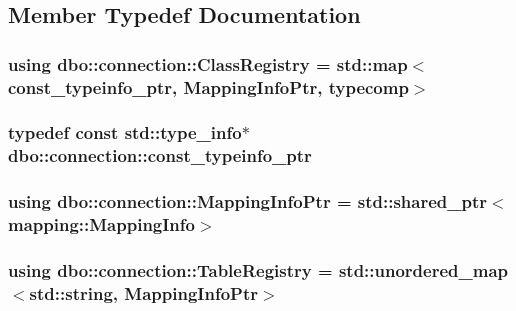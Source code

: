 \subsection{Member Typedef Documentation}
\hypertarget{classdbo_1_1connection_adecb3694055470fb13f96185f3804e4e}{
\subsubsection[{Class\+Registry}]{\setlength{\rightskip}{0pt plus 5cm}using {\bf dbo\+::connection\+::\+Class\+Registry} =  std\+::map$<${\bf const\+\_\+typeinfo\+\_\+ptr}, {\bf Mapping\+Info\+Ptr}, {\bf typecomp}$>$\hspace{0.3cm}{\ttfamily [protected]}}}\label{classdbo_1_1connection_adecb3694055470fb13f96185f3804e4e}
\hypertarget{classdbo_1_1connection_ad9b28dcf5699796d552af8a159f03a5a}{
\subsubsection[{const\+\_\+typeinfo\+\_\+ptr}]{\setlength{\rightskip}{0pt plus 5cm}typedef const std\+::type\+\_\+info$\ast$ {\bf dbo\+::connection\+::const\+\_\+typeinfo\+\_\+ptr}\hspace{0.3cm}{\ttfamily [protected]}}}\label{classdbo_1_1connection_ad9b28dcf5699796d552af8a159f03a5a}
\hypertarget{classdbo_1_1connection_acca03a784c87ffb1ec7bdf33f526dff5}{
\subsubsection[{Mapping\+Info\+Ptr}]{\setlength{\rightskip}{0pt plus 5cm}using {\bf dbo\+::connection\+::\+Mapping\+Info\+Ptr} =  std\+::shared\+\_\+ptr$<${\bf mapping\+::\+Mapping\+Info}$>$\hspace{0.3cm}{\ttfamily [protected]}}}\label{classdbo_1_1connection_acca03a784c87ffb1ec7bdf33f526dff5}
\hypertarget{classdbo_1_1connection_ac58484f4b88dbc57cbd1f63471aa456d}{
\subsubsection[{Table\+Registry}]{\setlength{\rightskip}{0pt plus 5cm}using {\bf dbo\+::connection\+::\+Table\+Registry} =  std\+::unordered\+\_\+map$<$std\+::string, {\bf Mapping\+Info\+Ptr}$>$\hspace{0.3cm}{\ttfamily [protected]}}}\label{classdbo_1_1connection_ac58484f4b88dbc57cbd1f63471aa456d}
